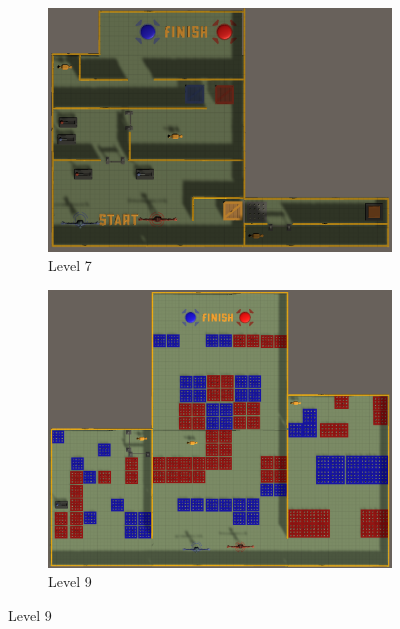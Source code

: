 \begin{figure}[h!]
\begin{subfigure}[b]{0.45\linewidth}
        \includegraphics[width=\linewidth]{images/level_7.png}
        \caption{Level 7}
        \label{fig:level 7}
      \end{subfigure}
    \begin{subfigure}[b]{0.45\linewidth}
        \includegraphics[width=\linewidth]{images/level_9.png}
        \caption{Level 9}
        \label{fig:level 9}
      \end{subfigure}
\end{figure}
